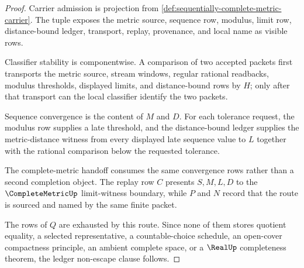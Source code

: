 \begin{proof}
Carrier admission is projection from \autoref{def:sequentially-complete-metric-carrier}. The tuple exposes the metric source, sequence row, modulus, limit row, distance-bound ledger, transport, replay, provenance, and local name as visible rows.

Classifier stability is componentwise. A comparison of two accepted packets first transports the metric source, stream windows, regular rational readbacks, modulus thresholds, displayed limits, and distance-bound rows by $H$; only after that transport can the local classifier identify the two packets.

Sequence convergence is the content of $M$ and $D$. For each tolerance request, the modulus row supplies a late threshold, and the distance-bound ledger supplies the metric-distance witness from every displayed late sequence value to $L$ together with the rational comparison below the requested tolerance.

The complete-metric handoff consumes the same convergence rows rather than a second completion object. The replay row $C$ presents $S,M,L,D$ to the $\CompleteMetricUp$ limit-witness boundary, while $P$ and $N$ record that the route is sourced and named by the same finite packet.

The rows of $Q$ are exhausted by this route. Since none of them stores quotient equality, a selected representative, a countable-choice schedule, an open-cover compactness principle, an ambient complete space, or a $\RealUp$ completeness theorem, the ledger non-escape clause follows.
\end{proof}

